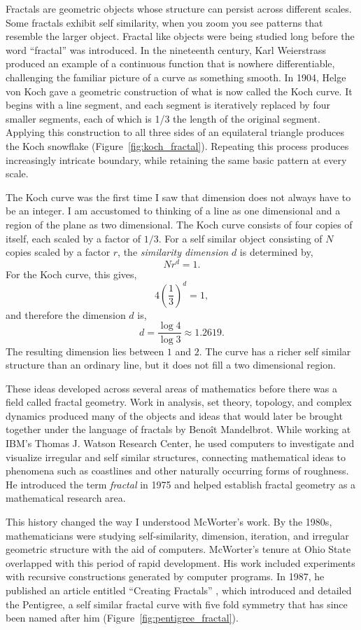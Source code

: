 \documentclass[pdflatex,sn-mathphys-num]{sn-jnl}%
\begin{document}
Fractals are geometric objects whose structure can persist across different scales. Some fractals exhibit self similarity, when you zoom you see patterns that resemble the larger object. Fractal like objects were being studied long before the word ``fractal'' was introduced. In the nineteenth century, Karl Weierstrass produced an example of a continuous function that is nowhere differentiable, challenging the familiar picture of a curve as something smooth. In 1904, Helge von Koch gave a geometric construction of what is now
called the Koch curve. It begins with a line segment, and each segment is iteratively replaced by four smaller segments, each of which is 1/3 the length of the original segment. Applying this construction to all three sides of an equilateral triangle produces the Koch snowflake (Figure~\ref{fig:koch_fractal}). Repeating this process produces increasingly intricate boundary, while retaining the same basic pattern at every scale. 

The Koch curve was the first time I saw that dimension does not always have to be an integer. I am accustomed to thinking of a line as one dimensional and a region of the plane as two dimensional. The Koch curve consists of four copies of itself, each scaled by a factor of $1/3$. For a self similar object consisting of $N$ copies scaled by a factor $r$, the \emph{similarity dimension} $d$ is determined by,
$$
Nr^d=1.
$$
For the Koch curve, this gives,
$$
4\left(\frac{1}{3}\right)^d=1,
$$
and therefore the dimension $d$ is,
$$
d=\frac{\log 4}{\log 3}\approx1.2619.
$$
The resulting dimension lies between $1$ and $2$. The curve has a richer
self similar structure than an ordinary line, but it does not fill a
two dimensional region.

These ideas developed across several areas of mathematics before there was a field called fractal geometry. Work in analysis, set theory, topology, and complex dynamics produced many of the objects and ideas that would later be brought together under the language of fractals by Benoît Mandelbrot. While working at IBM's Thomas J. Watson Research Center, he used computers to investigate and visualize irregular and self similar structures, connecting mathematical ideas to phenomena such as coastlines and other naturally occurring forms of roughness. He introduced the term \emph{fractal} in 1975 and helped establish fractal geometry as a mathematical research area.

This history changed the way I understood McWorter's work. By the 1980s,
mathematicians were studying self-similarity, dimension, iteration, and
irregular geometric structure with the aid of computers. McWorter's
tenure at Ohio State overlapped with this period of rapid development.
His work included experiments with recursive constructions generated by
computer programs. In 1987, he published an article entitled
``Creating Fractals'' \cite{mcworter1987creating}, which introduced and
detailed the Pentigree, a self similar fractal curve with five fold symmetry that has since been named after him (Figure~\ref{fig:pentigree_fractal}).
\end{document}

